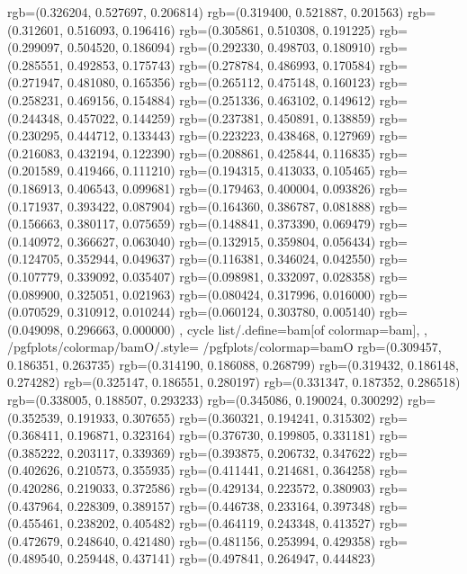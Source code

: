 {{{					rgb=(0.326204, 0.527697, 0.206814)
					rgb=(0.319400, 0.521887, 0.201563)
					rgb=(0.312601, 0.516093, 0.196416)
					rgb=(0.305861, 0.510308, 0.191225)
					rgb=(0.299097, 0.504520, 0.186094)
					rgb=(0.292330, 0.498703, 0.180910)
					rgb=(0.285551, 0.492853, 0.175743)
					rgb=(0.278784, 0.486993, 0.170584)
					rgb=(0.271947, 0.481080, 0.165356)
					rgb=(0.265112, 0.475148, 0.160123)
					rgb=(0.258231, 0.469156, 0.154884)
					rgb=(0.251336, 0.463102, 0.149612)
					rgb=(0.244348, 0.457022, 0.144259)
					rgb=(0.237381, 0.450891, 0.138859)
					rgb=(0.230295, 0.444712, 0.133443)
					rgb=(0.223223, 0.438468, 0.127969)
					rgb=(0.216083, 0.432194, 0.122390)
					rgb=(0.208861, 0.425844, 0.116835)
					rgb=(0.201589, 0.419466, 0.111210)
					rgb=(0.194315, 0.413033, 0.105465)
					rgb=(0.186913, 0.406543, 0.099681)
					rgb=(0.179463, 0.400004, 0.093826)
					rgb=(0.171937, 0.393422, 0.087904)
					rgb=(0.164360, 0.386787, 0.081888)
					rgb=(0.156663, 0.380117, 0.075659)
					rgb=(0.148841, 0.373390, 0.069479)
					rgb=(0.140972, 0.366627, 0.063040)
					rgb=(0.132915, 0.359804, 0.056434)
					rgb=(0.124705, 0.352944, 0.049637)
					rgb=(0.116381, 0.346024, 0.042550)
					rgb=(0.107779, 0.339092, 0.035407)
					rgb=(0.098981, 0.332097, 0.028358)
					rgb=(0.089900, 0.325051, 0.021963)
					rgb=(0.080424, 0.317996, 0.016000)
					rgb=(0.070529, 0.310912, 0.010244)
					rgb=(0.060124, 0.303780, 0.005140)
					rgb=(0.049098, 0.296663, 0.000000)
			},
		cycle list/.define={bam}{[of colormap=bam]},
		},
		/pgfplots/colormap/bamO/.style={
			/pgfplots/colormap={bamO}{%
					rgb=(0.309457, 0.186351, 0.263735)
					rgb=(0.314190, 0.186088, 0.268799)
					rgb=(0.319432, 0.186148, 0.274282)
					rgb=(0.325147, 0.186551, 0.280197)
					rgb=(0.331347, 0.187352, 0.286518)
					rgb=(0.338005, 0.188507, 0.293233)
					rgb=(0.345086, 0.190024, 0.300292)
					rgb=(0.352539, 0.191933, 0.307655)
					rgb=(0.360321, 0.194241, 0.315302)
					rgb=(0.368411, 0.196871, 0.323164)
					rgb=(0.376730, 0.199805, 0.331181)
					rgb=(0.385222, 0.203117, 0.339369)
					rgb=(0.393875, 0.206732, 0.347622)
					rgb=(0.402626, 0.210573, 0.355935)
					rgb=(0.411441, 0.214681, 0.364258)
					rgb=(0.420286, 0.219033, 0.372586)
					rgb=(0.429134, 0.223572, 0.380903)
					rgb=(0.437964, 0.228309, 0.389157)
					rgb=(0.446738, 0.233164, 0.397348)
					rgb=(0.455461, 0.238202, 0.405482)
					rgb=(0.464119, 0.243348, 0.413527)
					rgb=(0.472679, 0.248640, 0.421480)
					rgb=(0.481156, 0.253994, 0.429358)
					rgb=(0.489540, 0.259448, 0.437141)
					rgb=(0.497841, 0.264947, 0.444823)
}}}
